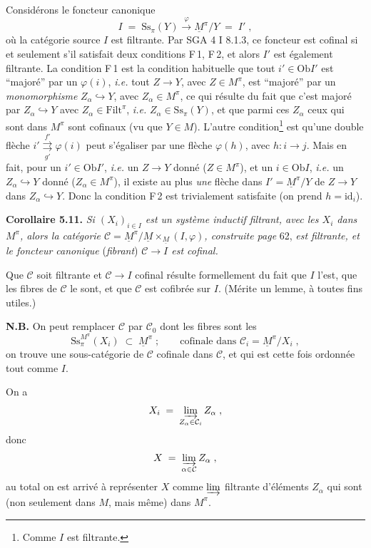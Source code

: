 \documentclass[11pt]{article}
\newcommand{\printedpage}[1]{\marginpar{\footnotesize p.~#1}}
\newcommand{\msp}[1]{\marginpar{\footnotesize [#1]}}
\newcommand{\Filt}{\mathrm{Filt}}
\newcommand{\Ob}{\mathrm{Ob}}
\newcommand{\Ss}{\mathrm{Ss}}
\newcommand{\Ci}{\mathcal{C}}
\begin{document}
Considérons le foncteur canonique
\[
I \;=\; \Ss_\pi(Y) \xrightarrow{\;\varphi\;} \underline{M}^\pi/Y \;=\; I' \;,
\]
où la catégorie source $I$ est filtrante. Par SGA 4 I 8.1.3, ce foncteur est cofinal si et seulement s'il satisfait deux conditions F\,1, F\,2, et alors $I'$ est également filtrante. La condition F\,1 est la condition habituelle que tout $i' \in \Ob I'$ est “majoré” par un $\varphi(i)$, \textit{i.e.} tout $Z \longrightarrow Y$, avec $Z \in M^\pi$, est “majoré” par un \textit{monomorphisme} $Z_\alpha \hookrightarrow Y$, avec $Z_\alpha \in M^\pi$, ce qui résulte du fait que c'est majoré par $Z_\alpha \hookrightarrow Y$ avec $Z_\alpha \in \Filt^\pi$, \textit{i.e.} $Z_\alpha \in \Ss_\pi(Y)$, et que parmi ces $Z_\alpha$ ceux qui sont dans $M^\pi$ sont cofinaux (vu que $Y \in M$). L'autre condition\footnote[23]{Comme $I$ est filtrante.} est qu'une double flèche $i' \overset{f'}{\underset{g'}{\rightrightarrows}} \varphi(i)$ peut
\msp{page 64}
s'égaliser par une flèche $\varphi(h)$, avec $h : i \longrightarrow j$. Mais en fait, pour un $i' \in \Ob I'$, \textit{i.e.} un $Z \longrightarrow Y$ donné ($Z \in M^\pi$), et un $i \in \Ob I$, \textit{i.e.} un $Z_\alpha \hookrightarrow Y$ donné ($Z_\alpha \in M^\pi$), il existe au plus \textit{une} flèche dans $I' = \underline{M}^\pi/Y$ de $Z \longrightarrow Y$ dans $Z_\alpha \hookrightarrow Y$. Donc la condition F\,2 est trivialement satisfaite (on prend $h = \mathrm{id}_i$).

\textbf{Corollaire 5.11.} \textit{Si $(X_i)_{i \in I}$ est un système inductif filtrant, avec les $X_i$ dans $M^\pi$, alors la catégorie $\Ci = \underline{M}^\pi/\underline{M} \times_{\underline{M}} (I,\varphi)$, construite page} 62, \textit{est filtrante, et le foncteur canonique} (\textit{fibrant}) \textit{$\Ci \longrightarrow I$ est cofinal.}

Que $\Ci$ soit filtrante et $\Ci \longrightarrow I$ cofinal résulte formellement du fait que $I$ l'est, que les fibres de $\Ci$ le sont, et que $\Ci$ est cofibrée sur $I$. (Mérite un lemme, à toutes fins utiles.)

\textbf{N.B.} On peut remplacer $\Ci$ par $\Ci_0$ dont les fibres sont les
\[
\Ss_\pi^{M^\pi}(X_i) \;\subset\; \underline{M}^\pi \;; \qquad \text{cofinale dans } \Ci_i = \underline{M}^\pi/X_i \;,
\]
\msp{page 65}
on trouve une sous-catégorie de $\Ci$ cofinale dans $\Ci$, et qui est cette fois ordonnée tout comme $I$.

\printedpage{38}
On a
\[
X_i \;=\; \varinjlim_{Z_\alpha \in \Ci_i} Z_\alpha \;,
\]
donc
\[
X \;=\; \varinjlim_{\alpha \in \Ci} Z_\alpha \;,
\]
au total on est arrivé à représenter $X$ comme $\varinjlim$ filtrante d'éléments $Z_\alpha$ qui sont (non seulement dans $M$, mais même) dans $M^\pi$.
\end{document}
